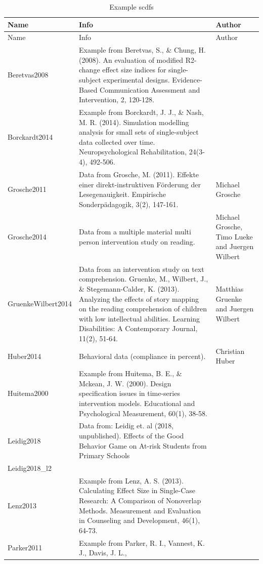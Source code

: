 \documentclass[
  letterpaper,
  DIV=11,
  numbers=noendperiod]{scrreprt}
\begin{document}
\hypertarget{tbl-example-scdf}{}
\begin{longtable}[]{@{}lll@{}}
\caption{\label{tbl-example-scdf}Example scdfs}\tabularnewline
\toprule()
Name & Info & Author \\
\midrule()
\endfirsthead
\toprule()
Name & Info & Author \\
\midrule()
\endhead
Beretvas2008 & Example from Beretvas, S., \& Chung, H. (2008). An
evaluation of modified R2-change effect size indices for single-subject
experimental designs. Evidence-Based Communication Assessment and
Intervention, 2, 120-128. & \\
Borckardt2014 & Example from Borckardt, J. J., \& Nash, M. R. (2014).
Simulation modelling analysis for small sets of single-subject data
collected over time. Neuropsychological Rehabilitation, 24(3-4),
492-506. & \\
Grosche2011 & Data from Grosche, M. (2011). Effekte einer
direkt-instruktiven Förderung der Lesegenauigkeit. Empirische
Sonderpädagogik, 3(2), 147-161. & Michael Grosche \\
Grosche2014 & Data from a multiple material multi person intervention
study on reading. & Michael Grosche, Timo Lueke and Juergen Wilbert \\
GruenkeWilbert2014 & Data from an intervention study on text
comprehension. Gruenke, M., Wilbert, J., \& Stegemann-Calder, K. (2013).
Analyzing the effects of story mapping on the reading comprehension of
children with low intellectual abilities. Learning Disabilities: A
Contemporary Journal, 11(2), 51-64. & Matthias Gruenke and Juergen
Wilbert \\
Huber2014 & Behavioral data (compliance in percent). & Christian
Huber \\
Huitema2000 & Example from Huitema, B. E., \& Mckean, J. W. (2000).
Design specification issues in time-series intervention models.
Educational and Psychological Measurement, 60(1), 38-58. & \\
Leidig2018 & Data from: Leidig et. al (2018, unpublished). Effects of
the Good Behavior Game on At-risk Students\textquotesingle{} from
Primary Schools & \\
Leidig2018\_l2 & & \\
Lenz2013 & Example from Lenz, A. S. (2013). Calculating Effect Size in
Single-Case Research: A Comparison of Nonoverlap Methods. Measurement
and Evaluation in Counseling and Development, 46(1), 64-73. & \\
Parker2011 & Example from Parker, R. I., Vannest, K. J., Davis, J. L.,

\end{longtable}
\end{document}
